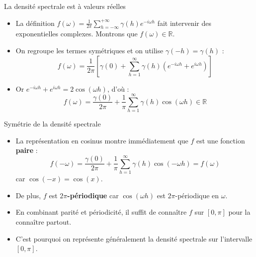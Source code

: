 \documentclass[11pt,aspectratio=169]{beamer}
\newcommand{\R}{\mathbb{R}}
\begin{document}
\begin{frame}{La densité spectrale est à valeurs réelles}

\begin{itemize}

\item La définition $f(\omega) = \frac{1}{2\pi} \sum_{h=-\infty}^{+\infty} \gamma(h) e^{-i\omega h}$ fait intervenir des exponentielles complexes. Montrons que $f(\omega) \in \R$.\newline

\item On regroupe les termes symétriques et on utilise $\gamma(-h) = \gamma(h)$ :
  \[
  f(\omega) = \frac{1}{2\pi} \left[ \gamma(0) + \sum_{h=1}^{\infty} \gamma(h) \left( e^{-i\omega h} + e^{i\omega h} \right) \right]
  \]\newline

\item Or $e^{-i\omega h} + e^{i\omega h} = 2\cos(\omega h)$, d'où :
  \[
  \boxed{f(\omega) = \frac{\gamma(0)}{2\pi} + \frac{1}{\pi} \sum_{h=1}^{\infty} \gamma(h) \cos(\omega h) \in \R}
  \]

\end{itemize}

\end{frame}

\begin{frame}{Symétrie de la densité spectrale}

\begin{itemize}

\item La représentation en cosinus montre immédiatement que $f$ est une fonction \textbf{paire} :
  \[
  f(-\omega) = \frac{\gamma(0)}{2\pi} + \frac{1}{\pi} \sum_{h=1}^{\infty} \gamma(h) \cos(-\omega h) = f(\omega)
  \]
  car $\cos(-x) = \cos(x)$.\newline

\item De plus, $f$ est \textbf{$2\pi$-périodique} car $\cos(\omega h)$ est $2\pi$-périodique en $\omega$.\newline

\item En combinant parité et périodicité, il suffit de connaître $f$ sur $[0, \pi]$ pour la connaître partout.\newline

\item C'est pourquoi on représente généralement la densité spectrale sur l'intervalle $[0, \pi]$.

\end{itemize}

\end{frame}
\end{document}
